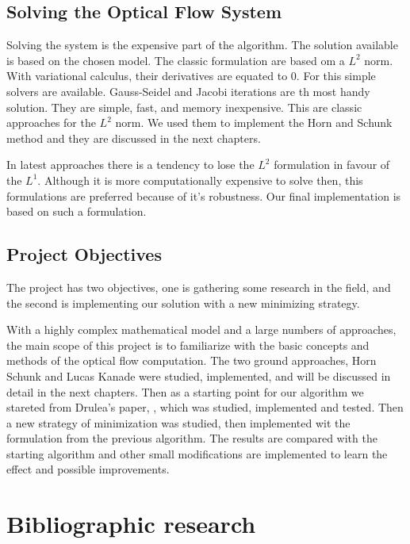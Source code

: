 \documentclass[12pt,a4paper,twoside]{report}
\begin{document}
\section{Solving the Optical Flow System}

Solving the system is the expensive part of the algorithm. The solution available is based on the chosen model. The classic formulation are based om a $L^2$ norm. With variational calculus, their derivatives are equated to 0. For this simple solvers are available. Gauss-Seidel and Jacobi iterations are th most handy solution. They are simple, fast, and memory inexpensive. This are classic approaches for the $L^2$ norm. We used them to implement the Horn and Schunk method and they are discussed in the next chapters.

In latest approaches there is a tendency to lose the $L^2$ formulation in favour of the $L^1$. Although it is more computationally expensive to solve then, this formulations are preferred because of it's robustness. Our final implementation is based on such a formulation. 

\section{Project Objectives}


The project has two objectives, one is gathering some research in the field, and the second is implementing our solution with a new minimizing strategy.

With a highly complex mathematical model and a large numbers of approaches, the main scope of this project is to familiarize with the basic concepts and methods of the optical flow computation. The two ground approaches, Horn Schunk and Lucas Kanade were studied, implemented, and will be discussed in detail in the next chapters. Then as a starting point for our algorithm we stareted from Drulea's paper, \cite{drulea2013}, which was studied, implemented and tested. Then a new strategy of minimization was studied, then implemented wit the formulation from the previous algorithm. The results are compared with the starting algorithm and other small modifications are implemented to learn the effect and possible improvements.


\chapter{Bibliographic research}


{\color{red}{must be about 9 pages}}
\end{document}
